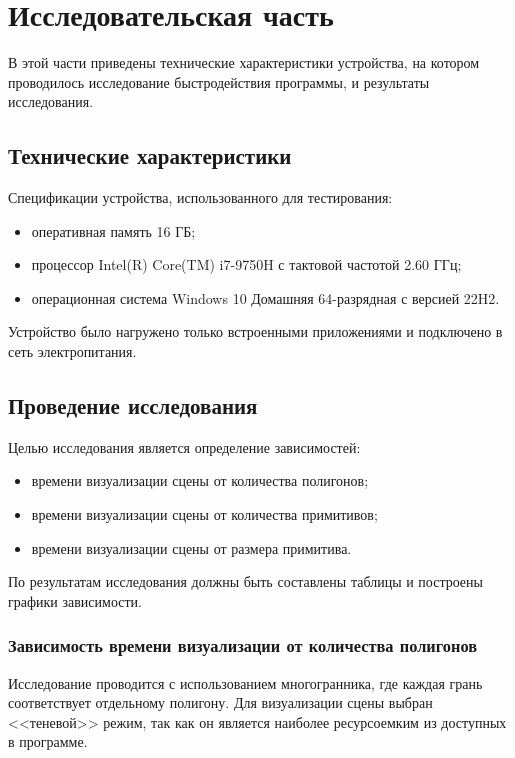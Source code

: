 \chapter{Исследовательская часть}

В этой части приведены технические характеристики устройства,
на котором проводилось исследование быстродействия программы, и результаты исследования.

\section{Технические характеристики}

Спецификации устройства, использованного для тестирования:
\begin{itemize}[label=--]
	\item оперативная память 16 ГБ;
	\item процессор Intel(R) Core(TM) i7-9750H с тактовой частотой 2.60 ГГц;
	\item операционная система Windows 10 Домашняя 64-разрядная с версией 22H2.
\end{itemize}

Устройство было нагружено только встроенными приложениями и подключено в сеть электропитания. 

\section{Проведение исследования}

Целью исследования является определение зависимостей: 
\begin{itemize}[label=--]
	\item времени визуализации сцены от количества полигонов;
	\item времени визуализации сцены от количества примитивов;
	\item времени визуализации сцены от размера примитива.
\end{itemize}

По результатам исследования должны быть составлены таблицы и построены графики зависимости.

\subsection{Зависимость времени визуализации от количества полигонов}

Исследование проводится с использованием многогранника, где каждая грань соответствует отдельному полигону. Для визуализации сцены выбран <<теневой>> режим, так как он является наиболее ресурсоемким из доступных в программе.


